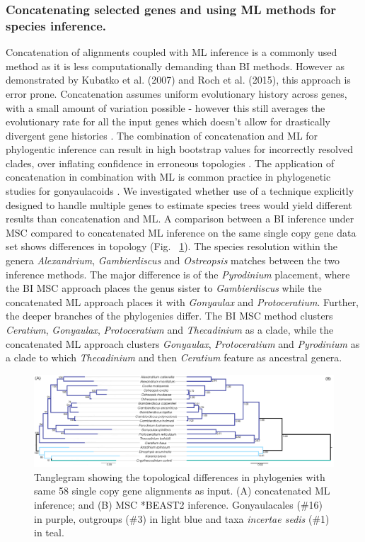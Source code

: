 \documentclass[fleqn,10pt,lineno]{wlpeerj} %
\begin{document}
\subsubsection*{Concatenating selected genes and using ML methods for species inference.}
Concatenation of alignments coupled with ML inference is a commonly used method as it is less computationally demanding than BI methods. 
However as demonstrated by Kubatko et al. (2007) and Roch et al. (2015), this approach is error prone. 
Concatenation assumes uniform evolutionary history across genes, with a small amount of variation possible - however this still averages the evolutionary rate for all the input genes which doesn't allow for drastically divergent gene histories \cite{roch2015likelihood}. 
The combination of concatenation and ML for phylogentic inference can result in high bootstrap values for incorrectly resolved clades, over inflating confidence in erroneous topologies \cite{degnan2009gene}. 
The application of concatenation in combination with ML is common practice in phylogenetic studies for gonyaulacoids  \cite{shalchian2006combined,zhang2007three,saldarriaga2004molecular,murray2005improving,hoppenrath2010dinoflagellate}.
We investigated whether use of a technique explicitly designed to handle multiple genes to estimate species trees would yield different results than concatenation and ML. 
A comparison between a BI inference under MSC compared to concatenated ML inference on the same single copy gene data set shows differences in topology (Fig. ~\ref{fig:tangleconcatML}). 
The species resolution within the genera \emph{Alexandrium}, \emph{Gambierdiscus} and \emph{Ostreopsis} matches between the two inference methods. 
The major difference is of the \emph{Pyrodinium} placement, where the BI MSC approach places the genus sister to \emph{Gambierdiscus} while the concatenated ML approach places it with \emph{Gonyaulax} and \emph{Protoceratium}. 
Further, the deeper branches of the phylogenies differ. 
The BI MSC method clusters \emph{Ceratium}, \emph{Gonyaulax}, \emph{Protoceratium} and \emph{Thecadinium} as a clade, while the concatenated ML approach clusters \emph{Gonyaulax}, \emph{Protoceratium} and \emph{Pyrodinium} as a clade to which \emph{Thecadinium} and then \emph{Ceratium} feature as ancestral genera. 

\begin{figure}[ht]
\centering
\includegraphics[width=\linewidth]{gonya-figs/MSC-BI-vs-singlecopy-concat-ML.png} 
\caption{Tanglegram showing the topological differences in phylogenies with same 58 single copy gene alignments as input. (A) concatenated ML inference; and (B) MSC *BEAST2 inference. Gonyaulacales (\#16) in purple, outgroups (\#3) in light blue and taxa \textit{incertae sedis} (\#1) in teal.} 
\label{fig:tangleconcatML}
\end{figure} 
\end{document}
